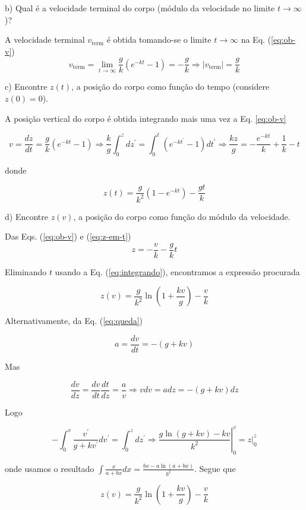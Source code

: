 \begin{enumerate}[start=1,label={\bfseries Q\arabic*.}]
b) Qual é a velocidade terminal do corpo (módulo da velocidade no limite $t \rightarrow \infty$)?

\resposta A velocidade terminal $v_{\text {term}}$ é obtida tomando-se o limite $t \rightarrow \infty$ na Eq. (\ref{eq:ob-v})
$$
v_{\text {term}}=\lim _{t \rightarrow \infty} \frac{g}{k}\left(e^{-k t}-1\right)=-\frac{g}{k} \Rightarrow\left|v_{\text {term}}\right|=\frac{g}{k}
$$

c) Encontre $z(t)$, a posição do corpo como função do tempo (considere $z(0) = 0$).

\resposta A posição vertical do corpo é obtida integrando mais uma vez a Eq. \ref{eq:ob-v}

$$
v=\frac{d z}{d t}=\frac{g}{k}\left(e^{-k t}-1\right) \Rightarrow \frac{k}{g} \int_{0}^{z} d z^{\prime}=\int_{0}^{t}\left(e^{-k t^{\prime}}-1\right) d t^{\prime} \Rightarrow \frac{k z}{g}=-\frac{e^{-k t}}{k}+\frac{1}{k}-t
$$

donde

\begin{equation}\label{eq:z-em-t}
z(t)=\frac{g}{k^{2}}\left(1-e^{-k t}\right)-\frac{g t}{k}
\end{equation}

d) Encontre $z(v)$, a posição do corpo como função do módulo da velocidade.

\resposta Das Eqs. (\ref{eq:ob-v}) e (\ref{eq:z-em-t})
$$
z=-\frac{v}{k}-\frac{g}{k} t
$$

Eliminando $t$ usando a Eq. (\ref{eq:integrando}), encontramos a expressão procurada

$$
z(v)=\frac{g}{k^{2}} \ln \left(1+\frac{k v}{g}\right)-\frac{v}{k}
$$

Alternativamente, da Eq. (\ref{eq:queda})

$$
a=\frac{d v}{d t}=-(g+k v)
$$

Mas

$$
\frac{d v}{d z}=\frac{d v}{d t} \frac{d t}{d z}=\frac{a}{v} \Rightarrow v d v=a d z=-(g+k v) d z
$$

Logo

$$
-\int_{0}^{v} \frac{v^{\prime}}{g+k v^{\prime}} d v^{\prime}=\left.\int_{0}^{z} d z^{\prime} \Rightarrow \frac{g \ln (g+k v)-k v}{k^{2}}\right|_{0} ^{v}=\left.z\right|_{0} ^{z}
$$

onde usamos o resultado $\int \frac{x}{a+b x} d x=\frac{b x-a \ln (a+b x)}{b^{2}} .$ Segue que

$$
z(v)=\frac{g}{k^{2}} \ln \left(1+\frac{k v}{g}\right)-\frac{v}{k}
$$





\end{enumerate}
